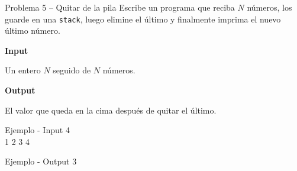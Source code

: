 \documentclass{article}
\begin{document}
\vspace{3.5em}


\begin{container}{Problema 5 – Quitar de la pila}
Escribe un programa que reciba $N$ números, los guarde en una \texttt{stack}, luego elimine el último y finalmente imprima el nuevo último número.
\end{container}

\textbf{Input}

Un entero $N$ seguido de $N$ números.

\vspace{0.5em}
\textbf{Output}

El valor que queda en la cima después de quitar el último.

\vspace{0.5em}

\begin{container}{Ejemplo - Input}
4\\ 
1 2 3 4
\end{container}

\begin{container}{Ejemplo - Output}
3
\end{container}
\end{document}
